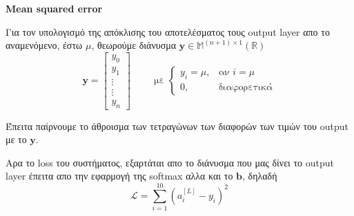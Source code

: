 \documentclass[a4paper,12pt]{article}
\begin{document}
\newpage

\section*{}
\begin{center}
    \Large \textbf{Mean squared error}
\end{center}

Για τον υπολογισμό της απόκλισης του αποτελέσματος τους output layer απο το αναμενόμενο, έστω $μ$, θεωρούμε διάνυσμα $\mathbf{y} \in \mathbb{M}^{(n+1)\times 1}(\mathbb{R})$
\[
\mathbf{y} =  \begin{bmatrix}
    y_0 \\
    y_1 \\
    \vdots \\
    \vdots \\
    y_{n}
\end{bmatrix} \hspace{1cm} \text{με } 
\begin{cases} 
y_i = μ, & \text{αν } i = μ \\
0, & \text{διαφορετικά}
\end{cases}
\]

Έπειτα παίρνουμε το άθροισμα των τετραγώνων των διαφορών των τιμών του output με το $\mathbf{y}$. 

Αρα το loss του συστήματος, εξαρτάται απο το διάνυσμα που μας δίνει το output layer έπειτα απο την εφαρμογή της softmax αλλα και το $\mathbf{b}$, δηλαδή
\[
\mathcal{L}= \sum_{i=1}^{10} (a_i^{[L]} - y_i)^2 
\]

\end{document}
